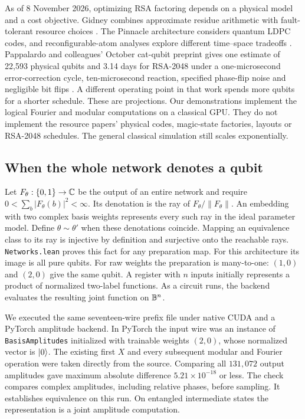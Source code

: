As of 8 November 2026, optimizing RSA factoring depends on a physical model and a cost objective. Gidney combines approximate residue arithmetic with fault-tolerant resource choices \cite{gidney}. The Pinnacle architecture considers quantum LDPC codes, and reconfigurable-atom analyses explore different time--space tradeoffs \cite{pinnacle,oratomic}. Pappalardo and colleagues' October cat-qubit preprint gives one estimate of 22,593 physical qubits and 3.14 days for RSA-2048 under a one-microsecond error-correction cycle, ten-microsecond reaction, specified phase-flip noise and negligible bit flips \cite{catshor}. A different operating point in that work spends more qubits for a shorter schedule. These are projections. Our demonstrations implement the logical Fourier and modular computations on a classical GPU. They do not implement the resource papers' physical codes, magic-state factories, layouts or RSA-2048 schedules. The general classical simulation still scales exponentially.

\subsection{When the whole network denotes a qubit}
Let $F_\theta:\{0,1\}\to\mathbb C$ be the output of an entire network and require $0<\sum_b|F_\theta(b)|^2<\infty$. Its denotation is the ray of $F_\theta/\|F_\theta\|$. An embedding with two complex basis weights represents every such ray in the ideal parameter model. Define $\theta\sim\theta'$ when these denotations coincide. Mapping an equivalence class to its ray is injective by definition and surjective onto the reachable rays. \texttt{Networks.lean} proves this fact for any preparation map. For this architecture its image is all pure qubits. For raw weights the preparation is many-to-one: $(1,0)$ and $(2,0)$ give the same qubit. A register with $n$ inputs initially represents a product of normalized two-label functions. As a circuit runs, the backend evaluates the resulting joint function on $\mathbb B^n$.

We executed the same seventeen-wire prefix file under native CUDA and a PyTorch amplitude backend. In PyTorch the input wire was an instance of \texttt{BasisAmplitudes} initialized with trainable weights $(2,0)$, whose normalized vector is $\lvert 0\rangle$. The existing first $X$ and every subsequent modular and Fourier operation were taken directly from the source. Comparing all $131{,}072$ output amplitudes gave maximum absolute difference $5.21\times10^{-18}$ or less. The check compares complex amplitudes, including relative phases, before sampling. It establishes equivalence on this run. On entangled intermediate states the representation is a joint amplitude computation.

